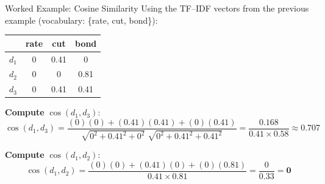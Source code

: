 \documentclass[aspectratio=169]{beamer}
\begin{document}
\begin{frame}{Worked Example: Cosine Similarity}
\small
Using the TF--IDF vectors from the previous example
(vocabulary: \{rate, cut, bond\}):

\begin{center}
\renewcommand{\arraystretch}{1.3}
\begin{tabular}{l c c c}
\hline
         & rate & cut & bond \\
\hline
$d_1$    & 0    & 0.41 & 0    \\
$d_2$    & 0    & 0    & 0.81 \\
$d_3$    & 0    & 0.41 & 0.41 \\
\hline
\end{tabular}
\end{center}


\textbf{Compute} $\cos(d_1, d_3)$:
\[
  \cos(d_1, d_3)
  = \frac{(0)(0) + (0.41)(0.41) + (0)(0.41)}
         {\sqrt{0^2 + 0.41^2 + 0^2}\;\sqrt{0^2 + 0.41^2 + 0.41^2}}
  = \frac{0.168}{0.41 \times 0.58}
  \approx \mathbf{0.707}
\]

\textbf{Compute} $\cos(d_1, d_2)$:
\[
  \cos(d_1, d_2)
  = \frac{(0)(0) + (0.41)(0) + (0)(0.81)}
         {0.41 \times 0.81}
  = \frac{0}{0.33}
  = \mathbf{0}
\]
\end{frame}
%
%
\end{document}

